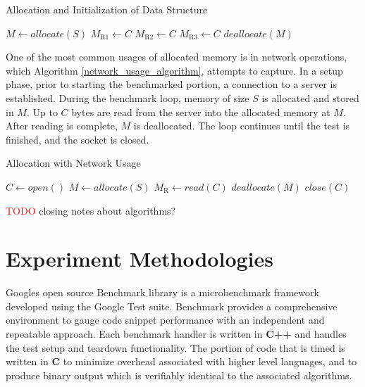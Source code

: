 \documentclass[letterpaper, 10 pt, conference]{ieeeconf}  %
\newcommand*\todo[0]{\textcolor{red}{TODO }}
\begin{document}
\begin{algorithm}[h]
  \caption{Allocation and Initialization of Data Structure}
  \begin{algorithmic}
      \STATE $M \leftarrow allocate(S)$
      \STATE $M_\text{R1} \leftarrow C$
      \STATE $M_\text{R2} \leftarrow C$
      \STATE $M_\text{R3} \leftarrow C$
      \STATE $deallocate(M)$
    \ENDWHILE
  \end{algorithmic}
  \label{struct_usage_algorithm}
\end{algorithm}

One of the most common usages of allocated memory is in network operations, which Algorithm \ref{network_usage_algorithm}, attempts to capture.
In a setup phase, prior to starting the benchmarked portion, a connection to a server is established.
During the benchmark loop, memory of size $S$ is allocated and stored in $M$.
Up to $C$ bytes are read from the server into the allocated memory at $M$.
After reading is complete, $M$ is deallocated.
The loop continues until the test is finished, and the socket is closed.

\begin{algorithm}[h]
  \caption{Allocation with Network Usage}
  \begin{algorithmic}
    \STATE $C \leftarrow open()$
      \STATE $M \leftarrow allocate(S)$
      \STATE $M_\text{R} \leftarrow read(C)$
      \STATE $deallocate(M)$
    \ENDWHILE
    \STATE $close(C)$
  \end{algorithmic}
  \label{network_usage_algorithm}
\end{algorithm}

\todo closing notes about algorithms?

\section{Experiment Methodologies}
Googles open source Benchmark library is a microbenchmark framework developed using the Google Test suite. Benchmark provides a comprehensive environment to gauge code snippet performance with an independent and repeatable approach.
Each benchmark handler is written in \textbf{C++} and handles the test setup and teardown functionality.
The portion of code that is timed is written in \textbf{C} to minimize overhead associated with higher level languages, and to produce binary output which is verifiably identical to the associated algorithms.
\end{document}
